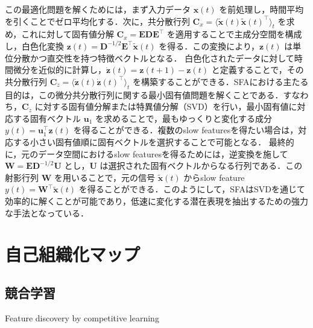 この最適化問題を解くためには，まず入力データ $\mathbf{x}(t)$ を前処理し，時間平均を引くことでゼロ平均化する．次に，共分散行列 $\mathbf{C}_x = \langle \tilde{\mathbf{x}}(t) \tilde{\mathbf{x}}(t)^\top \rangle_t$ を求め，これに対して固有値分解 $\mathbf{C}_x = \mathbf{E} \mathbf{D} \mathbf{E}^\top$ を適用することで主成分空間を構成し，白色化変換 $\mathbf{z}(t) = \mathbf{D}^{-1/2} \mathbf{E}^\top \tilde{\mathbf{x}}(t)$ を得る．この変換により，$\mathbf{z}(t)$ は単位分散かつ直交性を持つ特徴ベクトルとなる．
白色化されたデータに対して時間微分を近似的に計算し，$\dot{\mathbf{z}}(t) = \mathbf{z}(t+1) - \mathbf{z}(t)$ と定義することで，その共分散行列 $\mathbf{C}_{\dot{z}} = \langle \dot{\mathbf{z}}(t) \dot{\mathbf{z}}(t)^\top \rangle_t$ を構築することができる．SFAにおける主たる目的は，この微分共分散行列に関する最小固有値問題を解くことである．すなわち，$\mathbf{C}_{\dot{z}}$ に対する固有値分解または特異値分解（SVD）を行い，最小固有値に対応する固有ベクトル $\mathbf{u}_1$ を求めることで，最もゆっくりと変化する成分 $y(t) = \mathbf{u}_1^\top \mathbf{z}(t)$ を得ることができる．複数のslow featuresを得たい場合は，対応する小さい固有値順に固有ベクトルを選択することで可能となる．
最終的に，元のデータ空間におけるslow featuresを得るためには，逆変換を施して $\mathbf{W} = \mathbf{E} \mathbf{D}^{-1/2} \mathbf{U}$ とし，$\mathbf{U}$ は選択された固有ベクトルからなる行列である．この射影行列 $\mathbf{W}$ を用いることで，元の信号 $\tilde{\mathbf{x}}(t)$ からslow feature $y(t) = \mathbf{W}^\top \tilde{\mathbf{x}}(t)$ を得ることができる．このようにして，SFAはSVDを通じて効率的に解くことが可能であり，低速に変化する潜在表現を抽出するための強力な手法となっている．
\section{自己組織化マップ}
\subsection{競合学習}
Feature discovery by competitive learning

